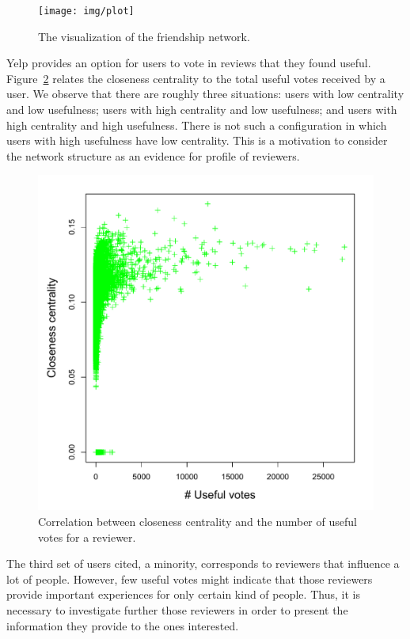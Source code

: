 \documentclass[12pt]{article}
\begin{document}
\begin{figure}[ht!]
\centering
\texttt{[image: img/plot]}
\caption{The visualization of the friendship network.}
\label{fig:plot}
\end{figure}

Yelp provides an option for users to vote in reviews that they found useful.
Figure~\ref{fig:clo_use} relates the closeness centrality to the total useful
votes received by a user. We observe that there are roughly three situations:
users with low centrality and low usefulness; users with high centrality and low
usefulness; and users with high centrality and high usefulness. There is not
such a configuration in which users with high usefulness have low centrality.
This is a motivation to consider the network structure as an evidence for
profile of reviewers.

\begin{figure}[H]
\centering
\includegraphics[scale=0.5]{img/close_useful_scatter}
\caption{Correlation between closeness centrality and the number of useful votes for a reviewer.}
\label{fig:clo_use}
\end{figure}

The third set of users cited, a minority, corresponds to reviewers that
influence a lot of people. However, few useful votes might indicate that those
reviewers provide important experiences for only certain kind of people. Thus,
it is necessary to investigate further those reviewers in order to present the
information they provide to the ones interested.
\end{document}
